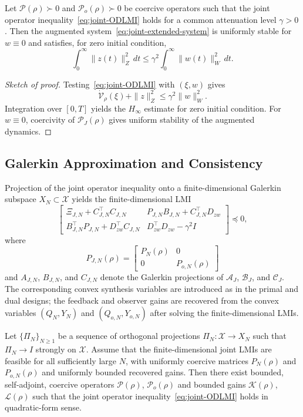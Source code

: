 \documentclass[AMA,Times2COL]{WileyNJDv5}
\begin{document}
\begin{theorem}
\label{thm:joint-Hinf}
Let $\mathcal{P}(\rho)\succ0$ and $\mathcal{P}_o(\rho)\succ0$ be coercive operators such that the joint operator inequality~\eqref{eq:joint-ODLMI}
holds for a common attenuation level $\gamma>0$. Then the augmented system~\eqref{eq:joint-extended-system} is uniformly stable for $w\equiv0$ and satisfies, for zero initial condition,
\[
\int_0^\infty \|z(t)\|_Z^2\,dt
\le
\gamma^2\int_0^\infty \|w(t)\|_W^2\,dt .
\]
\end{theorem}

\begin{proof}[Sketch of proof]
Testing~\eqref{eq:joint-ODLMI} with $(\xi,w)$ gives
\[
\dot{\mathcal V}_\rho(\xi)+\|z\|_Z^2
\le
\gamma^2\|w\|_W^2 .
\]
Integration over $[0,T]$ yields the $H_\infty$ estimate for zero initial condition. For $w\equiv0$, coercivity of $\mathcal P_J(\rho)$ gives uniform stability of the augmented dynamics.
\end{proof}

\subsection{Galerkin Approximation and Consistency}

Projection of the joint operator inequality onto a finite-dimensional Galerkin subspace $X_N\subset\mathscr X$ yields the finite-dimensional LMI
\[
\begin{bmatrix}
\Xi_{J,N}+C_{J,N}^{\top}C_{J,N}
&
P_{J,N}B_{J,N}+C_{J,N}^{\top}D_{zw}
\\[0.3em]
B_{J,N}^{\top}P_{J,N}+D_{zw}^{\top}C_{J,N}
&
D_{zw}^{\top}D_{zw}-\gamma^2 I
\end{bmatrix}
\preceq0,
\]
where
\[
P_{J,N}(\rho)
=
\begin{bmatrix}
P_N(\rho) & 0\\
0 & P_{o,N}(\rho)
\end{bmatrix}
\]
and $A_{J,N}$, $B_{J,N}$, and $C_{J,N}$ denote the Galerkin projections of $\mathcal A_J$, $\mathcal B_J$, and $\mathcal C_J$. The corresponding convex
synthesis variables are introduced as in the primal and dual designs; the feedback and observer gains are recovered from the convex variables
$(Q_N,Y_N)$ and $(Q_{o,N},Y_{o,N})$ after solving the finite-dimensional LMIs.

\begin{proposition}
\label{prop:joint-consistency}
Let $\{\Pi_N\}_{N\ge1}$ be a sequence of orthogonal projections $\Pi_N:\mathscr X\to X_N$ such that $\Pi_N\to I$ strongly on $\mathscr X$.
Assume that the finite-dimensional joint LMIs are feasible for all sufficiently large $N$, with uniformly coercive matrices $P_N(\rho)$ and $P_{o,N}(\rho)$
and uniformly bounded recovered gains. Then there exist bounded, self-adjoint, coercive operators $\mathcal P(\rho)$, $\mathcal P_o(\rho)$ and bounded gains $\mathcal K(\rho)$, $\mathcal L(\rho)$ such that the joint operator inequality~\eqref{eq:joint-ODLMI} holds in quadratic-form sense.
\end{proposition}
\end{document}
